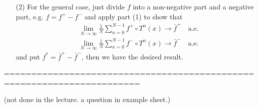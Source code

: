 \documentclass[10pt,a4paper]{report}
\newenvironment{proof}
{\begin{changemargin}{1cm}{0.5cm} 
	}%
	{\end{changemargin}
}
\begin{document}
\begin{proof}
\begin{itemize}
\item[(2)] For the general case, just divide $f$ into a non-negative part and a negative part, e.g. $f=f^+ - f^-$ and apply part (1) to show that
\begin{align*}
& \lim_{N\rightarrow \infty }\frac{1}{N} \sum_{n=0}^{N-1} f^+ \circ T^n (x) \rightarrow \bar{f}^+ \quad \text{a.e.} \\
& \lim_{N\rightarrow \infty }\frac{1}{N} \sum_{n=0}^{N-1} f^- \circ T^n (x) \rightarrow \bar{f}^- \quad \text{a.e.}
\end{align*}
and put $f^* = \bar{f}^+ - \bar{f}^-$, then we have the desired result.
\end{itemize} 

\eop
\end{proof}
\s

=======================================================================

(not done in the lecture. a question in example sheet.)
\end{document}
